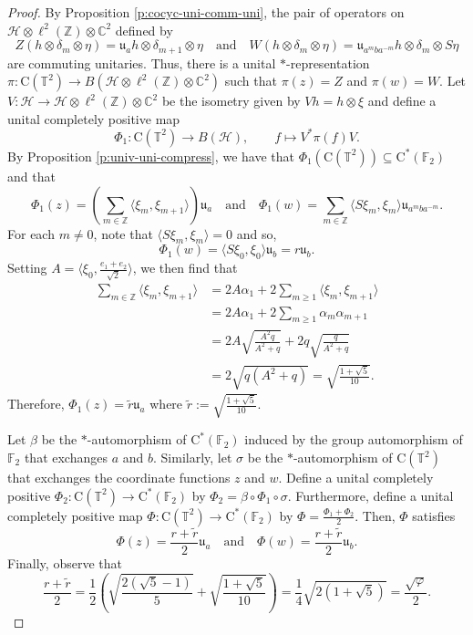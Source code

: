 \documentclass[10pt,a4paper]{amsart}
\newcommand{\bC}{{\mathbb{C}}}
\newcommand{\bF}{{\mathbb{F}}}
\newcommand{\bT}{{\mathbb{T}}}
\newcommand{\bZ}{{\mathbb{Z}}}
\newcommand{\rC}{\mathrm{C}}
\renewcommand{\H}{{\mathcal{H}}}
\renewcommand{\phi}{\varphi}
\begin{document}
\begin{proof}
    By Proposition \ref{p:cocyc-uni-comm-uni}, the pair of operators on $\H\otimes\ell^2(\bZ)\otimes\bC^2$ defined by
    \[
        Z(h\otimes\delta_m\otimes\eta) = \mathfrak{u}_ah\otimes\delta_{m+1}\otimes\eta \quad \text{and} \quad W(h\otimes\delta_m\otimes\eta) = \mathfrak{u}_{a^mba^{-m}}h\otimes\delta_m\otimes S\eta
    \]
    are commuting unitaries. Thus, there is a unital $*$-representation $\pi:\rC(\bT^2)\rightarrow B(\H\otimes\ell^2(\bZ)\otimes\bC^2)$ such that $\pi(z) = Z$ and $\pi(w) = W$. Let $V:\H\rightarrow\H\otimes\ell^2(\bZ)\otimes\bC^2$ be the isometry given by $Vh = h\otimes\xi$ and define a unital completely positive map
    \[
        \Phi_1:\rC(\bT^2)\longrightarrow B(\H), \qquad f\longmapsto V^*\pi(f)V.
    \]
    By Proposition \ref{p:univ-uni-compress}, we have that $\Phi_1(\rC(\bT^2))\subseteq\rC^*(\bF_2)$ and that
    \[
        \Phi_1(z) = \left( \sum_{m\in\mathbb Z} \langle \xi_m,\xi_{m+1}\rangle\right)\mathfrak{u}_a \quad \text{and} \quad \Phi_1(w) = \sum_{m\in\mathbb Z}\langle S\xi_m,\xi_m\rangle\mathfrak{u}_{a^m b a^{-m}}.
    \]
    For each $m\neq 0$, note that $\langle S\xi_m,\xi_m\rangle = 0$ and so,
    \[
        \Phi_1(w)= \langle S\xi_0,\xi_0\rangle\mathfrak{u}_b =r\mathfrak{u}_b.
    \]
    Setting $A = \langle \xi_0,\frac{e_1+e_2}{\sqrt{2}}\rangle$, we then find that
    \begin{align*}
        \sum_{m\in\bZ}\langle\xi_m, \xi_{m+1}\rangle & =2A\alpha_1  +  2\sum_{m\geq 1}\langle \xi_m, \xi_{m+1}\rangle\\
        & = 2A\alpha_1 + 2 \sum_{m\geq 1}\alpha_m \alpha_{m+1}\\
        & = 2A\sqrt{\frac{A^2q}{A^2+q}} +2q \sqrt{\frac{q}{A^2+q}}\\
        & = 2\sqrt{q\left(A^2 + q \right)} = \sqrt{\frac{1+\sqrt{5}}{10}}.
    \end{align*}
    Therefore, $\Phi_1(z)=\widetilde{r} \mathfrak{u}_a$ where $\widetilde{r}:=\sqrt{\frac{1+\sqrt{5}}{10}}$.
    
    Let $\beta$ be the $*$-automorphism of $\rC^*(\bF_2)$ induced by the group automorphism of $\bF_2$ that exchanges $a$ and $b$. Similarly, let $\sigma$ be the $*$-automorphism of $\rC(\bT^2)$ that exchanges the coordinate functions $z$ and $w$. Define a unital completely positive $\Phi_2:\rC(\bT^2)\rightarrow\rC^*(\bF_2)$ by $\Phi_2 =\beta\circ \Phi_1\circ \sigma$. Furthermore, define a unital completely positive map $\Phi:\rC(\bT^2)\rightarrow\rC^*(\bF_2)$ by $\Phi=\frac{\Phi_1+\Phi_2}{2}$. Then, $\Phi$ satisfies
    \[
        \Phi(z)=\frac{r+\widetilde{r}}{2}\mathfrak{u}_a \quad \text{and} \quad \Phi(w)=\frac{r+\widetilde{r}}{2}\mathfrak{u}_b.
    \]
    Finally, observe that
    \[
        \frac{r+\widetilde{r}}{2} = \frac{1}{2}\left(\sqrt{\frac{2(\sqrt{5}-1)}{5}} + \sqrt{\frac{1+\sqrt{5}}{10}} \right) = \frac{1}{4}\sqrt{2(1+\sqrt{5})} = \frac{\sqrt{\phi}}{2}.
    \]
\end{proof}
\end{document}
